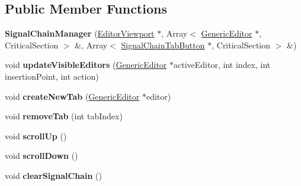\subsection*{Public Member Functions}
\begin{DoxyCompactItemize}
\item 
\hypertarget{classSignalChainManager_a4c9c6d8e9d696ccd5a4abc92be3ffd53}{{\bfseries Signal\-Chain\-Manager} (\hyperlink{classEditorViewport}{Editor\-Viewport} $\ast$, Array$<$ \hyperlink{classGenericEditor}{Generic\-Editor} $\ast$, Critical\-Section $>$ \&, Array$<$ \hyperlink{classSignalChainTabButton}{Signal\-Chain\-Tab\-Button} $\ast$, Critical\-Section $>$ \&)}\label{classSignalChainManager_a4c9c6d8e9d696ccd5a4abc92be3ffd53}

\item 
\hypertarget{classSignalChainManager_a5810903aa311504a5f645ab8e3407621}{void {\bfseries update\-Visible\-Editors} (\hyperlink{classGenericEditor}{Generic\-Editor} $\ast$active\-Editor, int index, int insertion\-Point, int action)}\label{classSignalChainManager_a5810903aa311504a5f645ab8e3407621}

\item 
\hypertarget{classSignalChainManager_ac41a67727bc44712f423037cab412c93}{void {\bfseries create\-New\-Tab} (\hyperlink{classGenericEditor}{Generic\-Editor} $\ast$editor)}\label{classSignalChainManager_ac41a67727bc44712f423037cab412c93}

\item 
\hypertarget{classSignalChainManager_af82c227f0c963a6520a50c2556380a27}{void {\bfseries remove\-Tab} (int tab\-Index)}\label{classSignalChainManager_af82c227f0c963a6520a50c2556380a27}

\item 
\hypertarget{classSignalChainManager_a81fbdd194556d6c45024aaa4078e10a4}{void {\bfseries scroll\-Up} ()}\label{classSignalChainManager_a81fbdd194556d6c45024aaa4078e10a4}

\item 
\hypertarget{classSignalChainManager_a8d764a6707907ac99ffb22dd01286452}{void {\bfseries scroll\-Down} ()}\label{classSignalChainManager_a8d764a6707907ac99ffb22dd01286452}

\item 
\hypertarget{classSignalChainManager_a4653928f580543c4b9f8e995a6c50007}{void {\bfseries clear\-Signal\-Chain} ()}\label{classSignalChainManager_a4653928f580543c4b9f8e995a6c50007}

\end{DoxyCompactItemize}
